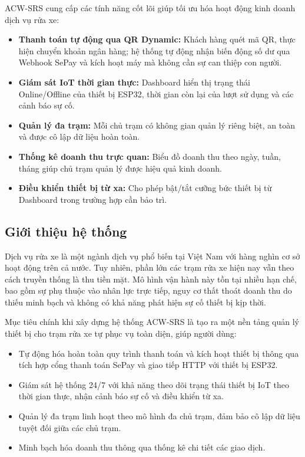 \documentclass[../main.tex]{subfiles}
\begin{document}
ACW-SRS cung cấp các tính năng cốt lõi giúp tối ưu hóa hoạt động kinh doanh dịch vụ rửa xe:
\begin{itemize}
    \item \textbf{Thanh toán tự động qua QR Dynamic:} Khách hàng quét mã QR, thực hiện chuyển khoản ngân hàng; hệ thống tự động nhận biến động số dư qua Webhook SePay và kích hoạt máy mà không cần sự can thiệp con người.
    \item \textbf{Giám sát IoT thời gian thực:} Dashboard hiển thị trạng thái Online/Offline của thiết bị ESP32, thời gian còn lại của lượt sử dụng và các cảnh báo sự cố.
    \item \textbf{Quản lý đa trạm:} Mỗi chủ trạm có không gian quản lý riêng biệt, an toàn và được cô lập dữ liệu hoàn toàn.
    \item \textbf{Thống kê doanh thu trực quan:} Biểu đồ doanh thu theo ngày, tuần, tháng giúp chủ trạm quản lý được hiệu quả kinh doanh.
    \item \textbf{Điều khiển thiết bị từ xa:} Cho phép bật/tắt cưỡng bức thiết bị từ Dashboard trong trường hợp cần bảo trì.
\end{itemize}

\subsection{Giới thiệu hệ thống}

Dịch vụ rửa xe là một ngành dịch vụ phổ biến tại Việt Nam với hàng nghìn cơ sở hoạt động trên cả nước. Tuy nhiên, phần lớn các trạm rửa xe hiện nay vẫn theo cách truyền thống là thu tiền mặt. Mô hình vận hành này tồn tại nhiều hạn chế, bao gồm sự phụ thuộc vào nhân lực trực tiếp, nguy cơ thất thoát doanh thu do thiếu minh bạch và không có khả năng phát hiện sự cố thiết bị kịp thời.

Mục tiêu chính khi xây dựng hệ thống ACW-SRS là tạo ra một nền tảng quản lý thiết bị cho trạm rửa xe tự phục vụ toàn diện, giúp người dùng:
\begin{itemize}
    \item Tự động hóa hoàn toàn quy trình thanh toán và kích hoạt thiết bị thông qua tích hợp cổng thanh toán SePay và giao tiếp HTTP với thiết bị ESP32.
    \item Giám sát hệ thống 24/7 với khả năng theo dõi trạng thái thiết bị IoT theo thời gian thực, nhận cảnh báo sự cố và điều khiển từ xa.
    \item Quản lý đa trạm linh hoạt theo mô hình đa chủ trạm, đảm bảo cô lập dữ liệu tuyệt đối giữa các chủ trạm.
    \item Minh bạch hóa doanh thu thông qua thống kê chi tiết các giao dịch.
\end{itemize}
\end{document}
